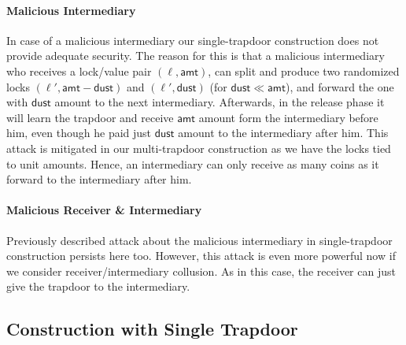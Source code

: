 \paragraph{Malicious Intermediary} In case of a malicious intermediary our single-trapdoor 
construction does not provide adequate security. The reason for this is that a malicious 
intermediary who receives a lock/value pair $(\ell, \mathsf{amt})$, can split and produce 
two randomized locks $(\ell', \mathsf{amt}-\mathsf{dust})$ and $(\ell', \mathsf{dust})$ 
(for $\mathsf{dust} \ll \mathsf{amt}$), and forward the one with $\mathsf{dust}$ amount to 
the next intermediary. Afterwards, in the release phase it will learn the trapdoor and receive 
$\mathsf{amt}$ amount form the intermediary before him, even though he paid just $\mathsf{dust}$ 
amount to the intermediary after him. This attack is mitigated in our multi-trapdoor 
construction as we have the locks tied to unit amounts. Hence, an intermediary can only 
receive as many coins as it forward to the intermediary after him.

\paragraph{Malicious Receiver \& Intermediary} Previously described attack about the malicious 
intermediary in single-trapdoor construction persists here too. However, this attack is even 
more powerful now if we consider receiver/intermediary collusion. As in this case, the receiver 
can just give the trapdoor to the intermediary. 


\subsection{Construction with Single Trapdoor}

